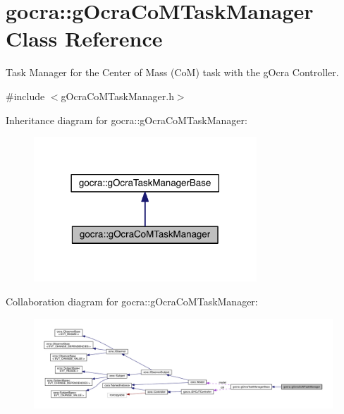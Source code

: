 \hypertarget{classgocra_1_1gOcraCoMTaskManager}{}\section{gocra\+:\+:g\+Ocra\+Co\+M\+Task\+Manager Class Reference}
\label{classgocra_1_1gOcraCoMTaskManager}


Task Manager for the Center of Mass (CoM) task with the g\+Ocra Controller.  




{\ttfamily \#include $<$g\+Ocra\+Co\+M\+Task\+Manager.\+h$>$}



Inheritance diagram for gocra\+:\+:g\+Ocra\+Co\+M\+Task\+Manager\+:\nopagebreak
\begin{figure}[H]
\begin{center}
\leavevmode
\includegraphics[width=237pt]{df/d4a/classgocra_1_1gOcraCoMTaskManager__inherit__graph}
\end{center}
\end{figure}


Collaboration diagram for gocra\+:\+:g\+Ocra\+Co\+M\+Task\+Manager\+:\nopagebreak
\begin{figure}[H]
\begin{center}
\leavevmode
\includegraphics[width=350pt]{da/db3/classgocra_1_1gOcraCoMTaskManager__coll__graph}
\end{center}
\end{figure}
